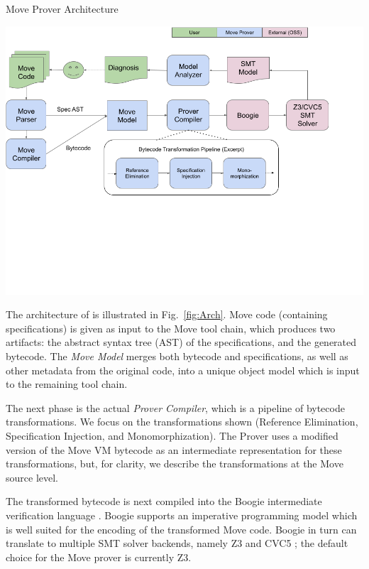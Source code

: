 
\begin{Figure}
  \centering
  \caption{Move Prover Architecture}
  \label{fig:Arch}
  \includegraphics[trim=0 250 0 0, width=\textwidth]{arch.png}
\end{Figure}

The architecture of \MVP is illustrated in Fig.~\ref{fig:Arch}. Move code
(containing specifications) is given as input to the Move tool chain, which
produces two artifacts: the abstract syntax tree (AST) of the specifications,
and the generated bytecode.  The \emph{Move Model} merges both bytecode and
specifications, as well as other metadata from the original code, into a unique
object model which is input to the remaining tool chain.

The next phase is the actual \emph{Prover Compiler}, which is a
pipeline of bytecode transformations. We focus on the
transformations shown (Reference Elimination, Specification Injection, and
Monomorphization).
The Prover uses a modified version of the Move VM bytecode as an intermediate
representation for these transformations, but, for clarity,
we describe the transformations at the Move source level.

The transformed bytecode is next compiled into the Boogie intermediate
verification language \cite{BOOGIE}. Boogie supports an imperative programming
model which is well suited for the encoding of the transformed Move code. Boogie
in turn can translate to multiple SMT solver backends, namely Z3 \cite{Z3} and
CVC5 \cite{CVC}; the default choice for the Move prover is currently Z3.

